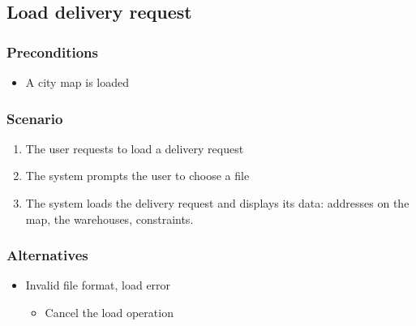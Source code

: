 \subsection{Load delivery request}\hypertarget{load-delivery-request}{}\label{load-delivery-request}

\subsubsection{Preconditions}\hypertarget{preconditions}{}\label{preconditions}

\begin{itemize}
\item A city map is loaded
\end{itemize}

\subsubsection{Scenario}\hypertarget{scenario}{}\label{scenario}

\begin{enumerate}
\item The user requests to load a delivery request
\item The system prompts the user to choose a file
\item The system loads the delivery request and displays its data: addresses on
the map, the warehouses, constraints.
\end{enumerate}

\subsubsection{Alternatives}\hypertarget{alternatives}{}\label{alternatives}

\begin{itemize}
\item Invalid file format, load error


\begin{itemize}
\item Cancel the load operation
\end{itemize}
\end{itemize}
